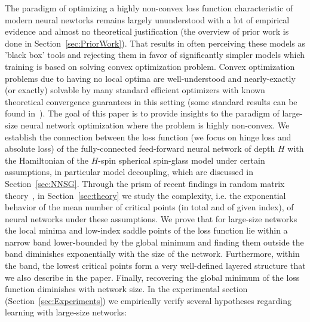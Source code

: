 \documentclass[twoside]{article}
\begin{document}
The paradigm of optimizing a highly non-convex loss function characteristic of modern neural newtorks remains largely ununderstood with a lot of empirical evidence and almost no theoretical justification (the overview of prior work is done in Section~\ref{sec:PriorWork}). That results in often perceiving these models as 'black box' tools and rejecting them in favor of significantly simpler models which training is based on solving convex optimization problem. Convex optimization problems due to having no local optima are well-understood and nearly-exactly (or exactly) solvable by many standard efficient optimizers with known theoretical convergence guarantees in this setting (some standard results can be found in~\cite{opac-b1104789, ben-tal_nemirovski:2001}). The goal of this paper is to provide insights to the paradigm of large-size neural network optimization where the problem is highly non-convex. We establish the connection between the loss function (we focus on hinge loss and absolute loss) of the fully-connected feed-forward neural network of depth $H$ with the Hamiltonian of the $H$-spin spherical spin-glass model under certain assumptions, in particular model decoupling, which are discussed in Section~\ref{sec:NNSG}. Through the prism of recent findings in random matrix theory~\cite{AAC2010}, in Section~\ref{sec:theory} we study the complexity, i.e. the exponential behavior of the mean number of critical points (in total and of given index), of neural networks under these assumptions. We prove that for large-size networks the local minima and low-index saddle points of the loss function lie within a narrow band lower-bounded by the global minimum and finding them outside the band diminishes exponentially with the size of the network. Furthermore, within the band, the lowest critical points form a very well-defined layered structure that we also describe in the paper. Finally, recovering the global minimum of the loss function diminishes with network size. In the experimental section (Section~\ref{sec:Experiments}) we empirically verify several hypotheses regarding learning with large-size networks:
\vspace{-0.05in}
\end{document}
